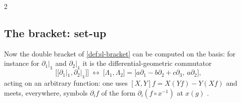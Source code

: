 \begin{paracol}{2}
\subsection{The bracket: set-up}\label{sec:sl-bracketsetup}
Now the double bracket of \cref{def:sl-bracket} can be computed on the basis: for instance for $\partial_1|_{\mathbb 1}$ and $\partial_2|_{\mathbb 1}$ it is the differential-geometric commutator
\[
  \bigl[\!\bigl[\partial_1|_{\mathbb 1},\partial_2|_{\mathbb 1}\bigr]\!\bigr]\ \leftrightarrow\ \bigl[\Lambda_1,\Lambda_2\bigr]=\bigl[a\partial_1-b\partial_2+c\partial_3,\ a\partial_2\bigr],
\]
acting on an arbitrary function: one uses $[X,Y]f=X(Yf)-Y(Xf)$ and meets, everywhere, symbols $\partial_if$ of the form $\partial_i(f\circ x^{-1})$ at $x(g)$         .


\end{paracol}
